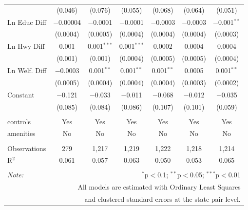 \begin{table}[!htbp]
\begin{tabular}{@{\extracolsep{5pt}}lcccccc}
  & (0.046) & (0.076) & (0.055) & (0.068) & (0.064) & (0.051) \\ 
  Ln Educ Diff & $-$0.00004 & $-$0.0001 & $-$0.0001 & $-$0.0003 & $-$0.0003 & $-$0.001$^{**}$ \\ 
  & (0.0004) & (0.0005) & (0.0004) & (0.0004) & (0.0004) & (0.0003) \\ 
  Ln Hwy Diff & 0.001 & 0.001$^{***}$ & 0.001$^{***}$ & 0.0002 & 0.0004 & 0.0004 \\ 
  & (0.001) & (0.001) & (0.0004) & (0.0005) & (0.0005) & (0.0004) \\ 
  Ln Welf. Diff & $-$0.0003 & 0.001$^{**}$ & 0.001$^{**}$ & 0.001$^{**}$ & 0.0005 & 0.001$^{**}$ \\ 
  & (0.0005) & (0.0004) & (0.0004) & (0.0004) & (0.0003) & (0.0002) \\ 
  Constant & $-$0.121 & $-$0.033 & $-$0.011 & $-$0.068 & $-$0.012 & $-$0.035 \\ 
  & (0.085) & (0.084) & (0.086) & (0.107) & (0.101) & (0.059) \\ 
 \hline \\[-1.8ex] 
controls & Yes & Yes & Yes & Yes & Yes & Yes \\ 
amenities & No & No & No & No & No & No \\ 
\hline \\[-1.8ex] 
Observations & 279 & 1,217 & 1,219 & 1,222 & 1,218 & 1,214 \\ 
R$^{2}$ & 0.061 & 0.057 & 0.063 & 0.050 & 0.053 & 0.065 \\ 
\hline 
\hline \\[-1.8ex] 
\textit{Note:}  & \multicolumn{6}{r}{$^{*}$p$<$0.1; $^{**}$p$<$0.05; $^{***}$p$<$0.01} \\ 
 & \multicolumn{6}{r}{All models are estimated with Ordinary Least Squares} \\ 
 & \multicolumn{6}{r}{and clustered standard errors at the state-pair level.} \\ 
\end{tabular} 
\end{table} 
